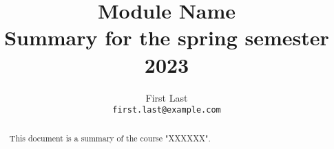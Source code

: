 \documentclass[11pt,a4paper]{article}
\begin{document}
\title{Module Name\\
\vspace{30px}
\large{Summary for the spring semester 2023}}
\author{
  First Last\\ \texttt{first.last@example.com}	
}

\maketitle

\begin{abstract}
  This document is a summary of the course "XXXXXX". 
\end{abstract}

\tableofcontents




\end{document}
